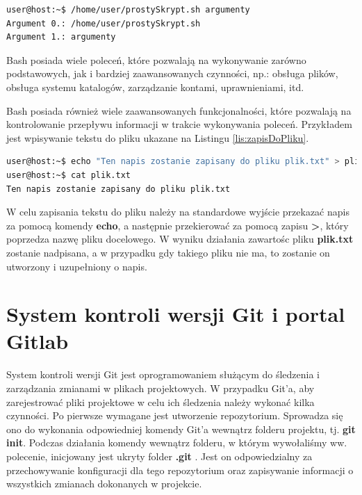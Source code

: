\begin{lstlisting}[language=bash,caption={Przykład działania Skryptu z Listingu \ref{lst:prostySkrypt}}]
user@host:~$ /home/user/prostySkrypt.sh argumenty
Argument 0.: /home/user/prostySkrypt.sh
Argument 1.: argumenty
\end{lstlisting}

Bash posiada wiele poleceń, które pozwalają na wykonywanie zarówno podstawowych, jak i bardziej zaawansowanych czynności, np.: obsługa plików, obsługa systemu katalogów, zarządzanie kontami, uprawnieniami, itd.\par
Bash posiada również wiele zaawansowanych funkcjonalności, które pozwalają na kontrolowanie przepływu informacji w trakcie wykonywania poleceń. Przykładem jest wpisywanie tekstu do pliku ukazane na Listingu \ref{lis:zapisDoPliku}.

\begin{lstlisting}[label={lis:zapisDoPliku},language=bash,caption={Przykład zapisu tekstu do pliku}]
user@host:~$ echo "Ten napis zostanie zapisany do pliku plik.txt" > plik.txt
user@host:~$ cat plik.txt
Ten napis zostanie zapisany do pliku plik.txt
\end{lstlisting}

W celu zapisania tekstu do pliku należy na standardowe wyjście przekazać napis za pomocą komendy \textbf{echo}, a następnie przekierować za pomocą zapisu \textbf{>}, który poprzedza nazwę pliku docelowego. W wyniku działania zawartośc pliku \textbf{plik.txt} zostanie nadpisana, a w przypadku gdy takiego pliku nie ma, to zostanie on utworzony i uzupełniony o napis.\par


\section{System kontroli wersji Git i portal Gitlab}
System kontroli wersji Git jest oprogramowaniem służącym do śledzenia i zarządzania zmianami w plikach projektowych. W przypadku Git'a, aby zarejestrować pliki projektowe w celu ich śledzenia należy wykonać kilka czynności. Po pierwsze wymagane jest utworzenie repozytorium. Sprowadza się ono do wykonania odpowiedniej komendy Git'a wewnątrz folderu projektu, tj. \textbf{git init}. Podczas działania komendy wewnątrz folderu, w którym wywołaliśmy ww. polecenie, inicjowany jest ukryty folder \textbf{.git}
. Jest on odpowiedzialny za przechowywanie konfiguracji dla tego repozytorium oraz zapisywanie informacji o wszystkich zmianach dokonanych w projekcie.

